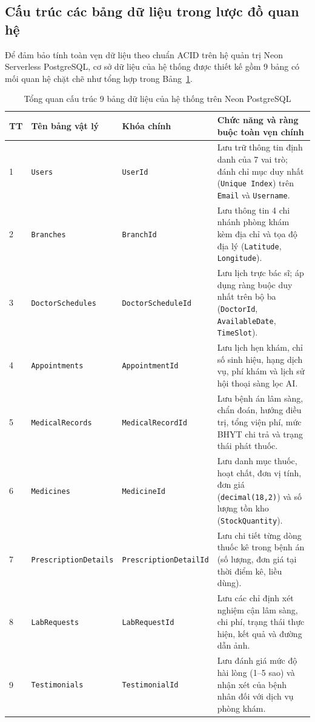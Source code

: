 \subsection{Cấu trúc các bảng dữ liệu trong lược đồ quan hệ}

Để đảm bảo tính toàn vẹn dữ liệu theo chuẩn ACID trên hệ quản trị Neon Serverless PostgreSQL, cơ sở dữ liệu của hệ thống được thiết kế gồm 9 bảng có mối quan hệ chặt chẽ như tổng hợp trong Bảng~\ref{tab:db_schema_overview}.

\begin{table}[H]
\caption{Tổng quan cấu trúc 9 bảng dữ liệu của hệ thống trên Neon PostgreSQL}
\label{tab:db_schema_overview}
\centering
\begin{tabular}{|p{0.8cm}|p{3.5cm}|p{2.7cm}|p{7.0cm}|}
\hline
\textbf{TT} & \textbf{Tên bảng vật lý} & \textbf{Khóa chính} & \textbf{Chức năng và ràng buộc toàn vẹn chính} \\
\hline
1 & \texttt{Users} & \texttt{UserId} & Lưu trữ thông tin định danh của 7 vai trò; đánh chỉ mục duy nhất (\texttt{Unique Index}) trên \texttt{Email} và \texttt{Username}. \\
\hline
2 & \texttt{Branches} & \texttt{BranchId} & Lưu thông tin 4 chi nhánh phòng khám kèm địa chỉ và tọa độ địa lý (\texttt{Latitude}, \texttt{Longitude}). \\
\hline
3 & \texttt{DoctorSchedules} & \texttt{DoctorScheduleId} & Lưu lịch trực bác sĩ; áp dụng ràng buộc duy nhất trên bộ ba (\texttt{DoctorId}, \texttt{AvailableDate}, \texttt{TimeSlot}). \\
\hline
4 & \texttt{Appointments} & \texttt{AppointmentId} & Lưu lịch hẹn khám, chỉ số sinh hiệu, hạng dịch vụ, phí khám và lịch sử hội thoại sàng lọc AI. \\
\hline
5 & \texttt{MedicalRecords} & \texttt{MedicalRecordId} & Lưu bệnh án lâm sàng, chẩn đoán, hướng điều trị, tổng viện phí, mức BHYT chi trả và trạng thái phát thuốc. \\
\hline
6 & \texttt{Medicines} & \texttt{MedicineId} & Lưu danh mục thuốc, hoạt chất, đơn vị tính, đơn giá (\texttt{decimal(18,2)}) và số lượng tồn kho (\texttt{StockQuantity}). \\
\hline
7 & \texttt{PrescriptionDetails} & \texttt{PrescriptionDetailId} & Lưu chi tiết từng dòng thuốc kê trong bệnh án (số lượng, đơn giá tại thời điểm kê, liều dùng). \\
\hline
8 & \texttt{LabRequests} & \texttt{LabRequestId} & Lưu các chỉ định xét nghiệm cận lâm sàng, chi phí, trạng thái thực hiện, kết quả và đường dẫn ảnh. \\
\hline
9 & \texttt{Testimonials} & \texttt{TestimonialId} & Lưu đánh giá mức độ hài lòng (1--5 sao) và nhận xét của bệnh nhân đối với dịch vụ phòng khám. \\
\hline
\end{tabular}
\end{table}

